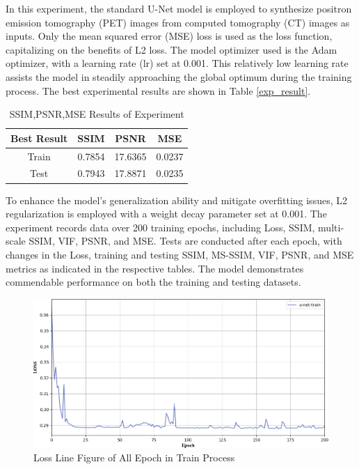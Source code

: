 \documentclass[twocolumn]{article}
\begin{document}
In this experiment, the standard U-Net model is employed to synthesize positron emission tomography (PET) images from computed tomography (CT) images as inputs. Only the mean squared error (MSE) loss is used as the loss function, capitalizing on the benefits of L2 loss. The model optimizer used is the Adam optimizer, with a learning rate (lr) set at 0.001. This relatively low learning rate assists the model in steadily approaching the global optimum during the training process. The best experimental results are shown in Table \ref{exp_result}.

\begin{table}[h]
	\centering
	\caption{SSIM,PSNR,MSE Results of Experiment}
	\label{tab:exp_result}
	\begin{tabular}{cccc}
		\toprule
		Best Result & SSIM   & PSNR    & MSE    \\
		\midrule
		Train       & 0.7854 & 17.6365 & 0.0237 \\
		Test        & 0.7943 & 17.8871 & 0.0235 \\
		\bottomrule
	\end{tabular}
\end{table}


To enhance the model's generalization ability and mitigate overfitting issues, L2 regularization is employed with a weight decay parameter set at 0.001. The experiment records data over 200 training epochs, including Loss, SSIM, multi-scale SSIM, VIF, PSNR, and MSE. Tests are conducted after each epoch, with changes in the Loss, training and testing SSIM, MS-SSIM, VIF, PSNR, and MSE metrics as indicated in the respective tables. The model demonstrates commendable performance on both the training and testing datasets.

\begin{figure}[h]
	\centering
	\includegraphics[width=1.0\linewidth]{u-net/LOSS}
	\caption[loss_train]{Loss Line Figure of All Epoch in Train Process}
	\label{fig:loss_train}
\end{figure}
\end{document}

